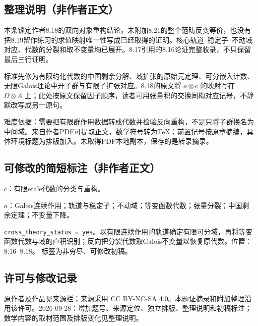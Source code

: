 \documentclass[UTF8,11pt]{ctexart}
\theoremstyle{definition}
\begin{document}
\subsection*{整理说明（非作者正文）}
本条锁定作者8.18的双向对象重构结论，未附加8.21的整个范畴反变等价，也没有把8.19留作练习的求值映射唯一性写成已经取得的证明。核心轨道--稳定子--不动域对应、代数的分裂和取不变量均已展开。8.17引用的8.16论证完整收录，不只保留最后三行证明。

标准先修为有限约化代数的中国剩余分解、域扩张的原始元定理、可分嵌入计数、无限Galois理论中开子群与有限子扩张对应。8.18的原文将 $a\otimes c$ 的映射写在 $\Omega\otimes A$ 上；此处按原文保留因子顺序，读者可用张量积的交换同构对应记号，不静默改写成另一原句。

难度依据：需要把有限群作用数据转成代数并检验反向重构，不是只将子群换名为中间域。来自作者PDF可提取正文，数学符号转为TeX；前置记号按原章摘编，具体环境标题为排版加入。未取得PDF本地副本，保存的是转录摘录。
\subsection*{可修改的简短标注（非作者正文）}
$c$：有限etale代数的分类与重构。

$a$：Galois连续作用；轨道与稳定子；不动域；等变函数代数；张量分裂；中国剩余定理；不变量下降。

\texttt{cross\_theory\_status = yes}。以有限连续作用的轨道确定有限可分域，再将等变函数代数与域的直积识别；反向把分裂代数取Galois不变量以恢复原代数。位置：8.16--8.18。
标签为非穷尽、可修改初稿。
\subsection*{许可与修改记录}
原作者及作品见来源栏；来源采用 CC BY-NC-SA 4.0。本题证摘录和附加整理沿用该许可。2026-09-28：增加题号、来源定位、独立排版、整理说明和初稿标注；数学内容的取材范围及排版变化见整理说明。
\end{document}
